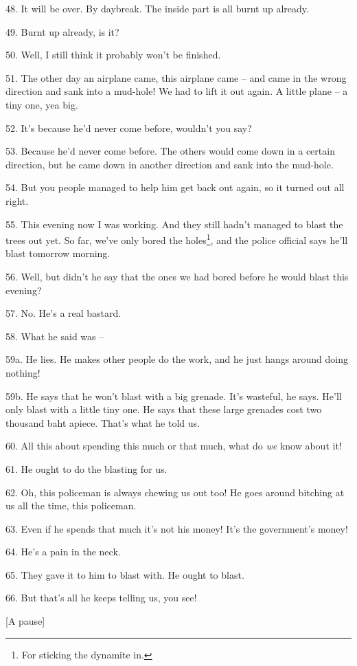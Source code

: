 48. It will be over. By daybreak. The inside part is all burnt up already.

49. Burnt up already, is it?

50. Well, I still think it probably won't be finished.

51. The other day an airplane came, this airplane came -- and came in the wrong
direction and sank into a mud-hole! We had to lift it out again. A little plane
-- a tiny one, yea big.

52. It's because he'd never come before, wouldn't you say?

53. Because he'd never come before. The others would come down in a certain direction,
but he came down in another direction and sank into the mud-hole.

54. But you people managed to help him get back out again, so it turned out all
right.

55. This evening now I was working. And they still hadn't managed to blast the
trees out yet. So far, we've only bored the holes\footnote{For sticking the dynamite in.}, and the police official
says he'll blast tomorrow morning.

56. Well, but didn't he say that the ones we had bored before he would blast this
evening?

57. No. He's a real bastard.

58. What he said was --

59a. He lies. He makes other people do the work, and he just hangs around doing
nothing!

59b. He says that he won't blast with a big grenade. It's wasteful, he says. He'll
only blast with a little tiny one. He says that these large grenades cost two thousand
baht apiece. That's what he told us.

60. All this about spending this much or that much, what do \textit{we} know about
it!

61. He ought to do the blasting for us.

62. Oh, this policeman is always chewing us out too! He goes around bitching at
us all the time, this policeman.

63. Even if he spends that much it's not his money! It's the government's money!

64. He's a pain in the neck.

65. They gave it to him to blast with. He ought to blast.

66. But that's all he keeps telling us, you see!

\begin{center}
[A pause]
\end{center}

